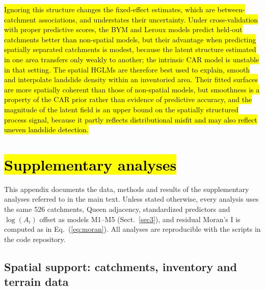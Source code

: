 \documentclass[journal abbreviation, manuscript]{copernicus}
\newcommand{\hlE}[1]{{\sethlcolor{edcyan}\hl{#1}}}
\begin{document}
\hlE{Ignoring this structure changes the fixed-effect estimates, which are between-catchment associations, and understates their uncertainty. Under cross-validation with proper predictive scores, the BYM and Leroux models predict held-out catchments better than non-spatial models, but their advantage when predicting spatially separated catchments is modest, because the latent structure estimated in one area transfers only weakly to another; the intrinsic CAR model is unstable in that setting. The spatial HGLMs are therefore best used to explain, smooth and interpolate landslide density within an inventoried area. Their fitted surfaces are more spatially coherent than those of non-spatial models, but smoothness is a property of the CAR prior rather than evidence of predictive accuracy, and the magnitude of the latent field is an upper bound on the spatially structured process signal, because it partly reflects distributional misfit and may also reflect uneven landslide detection.}


\appendix
\section{\hlE{Supplementary analyses}}\label{secA}
\appendixfigures
\appendixtables

This appendix documents the data, methods and results of the supplementary analyses referred to in the main text. Unless stated otherwise, every analysis uses the same 526 catchments, Queen adjacency, standardized predictors and $\log(A_i)$ offset as models M1--M5 (Sect.~\ref{sec3}), and residual Moran's I is computed as in Eq.~(\ref{eq:moran}). All analyses are reproducible with the scripts in the code repository.

\subsection{Spatial support: catchments, inventory and terrain data}\label{secA1}
\end{document}
